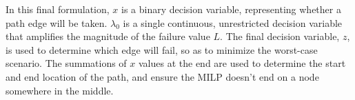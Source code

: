 \documentclass{article}
\begin{document}
In this final formulation, $x$ is a binary decision variable, representing whether a path edge will be taken. $\lambda_0$ is a single continuous, unrestricted decision variable that amplifies the magnitude of the failure value $L$. The final decision variable, $z$, is used to determine which edge will fail, so as to minimize the worst-case scenario. The summations of $x$ values at the end are used to determine the start and end location of the path, and ensure the MILP doesn't end on a node somewhere in the middle.
\end{document}
